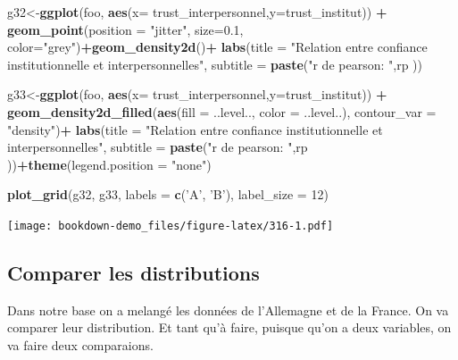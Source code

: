 \documentclass[
]{book}
\newenvironment{Shaded}{\begin{snugshade}}{\end{snugshade}}
\newcommand{\DataTypeTok}[1]{\textcolor[rgb]{0.13,0.29,0.53}{#1}}
\newcommand{\DecValTok}[1]{\textcolor[rgb]{0.00,0.00,0.81}{#1}}
\newcommand{\FloatTok}[1]{\textcolor[rgb]{0.00,0.00,0.81}{#1}}
\newcommand{\KeywordTok}[1]{\textcolor[rgb]{0.13,0.29,0.53}{\textbf{#1}}}
\newcommand{\NormalTok}[1]{#1}
\newcommand{\OperatorTok}[1]{\textcolor[rgb]{0.81,0.36,0.00}{\textbf{#1}}}
\newcommand{\StringTok}[1]{\textcolor[rgb]{0.31,0.60,0.02}{#1}}
\begin{document}
\begin{Shaded}
\begin{Highlighting}[]
\NormalTok{g32<-}\KeywordTok{ggplot}\NormalTok{(foo, }\KeywordTok{aes}\NormalTok{(}\DataTypeTok{x=}\NormalTok{ trust_interpersonnel,}\DataTypeTok{y=}\NormalTok{trust_institut)) }\OperatorTok{+}
\StringTok{  }\KeywordTok{geom_point}\NormalTok{(}\DataTypeTok{position =} \StringTok{"jitter"}\NormalTok{, }\DataTypeTok{size=}\FloatTok{0.1}\NormalTok{, }\DataTypeTok{color=}\StringTok{"grey"}\NormalTok{)}\OperatorTok{+}\KeywordTok{geom_density2d}\NormalTok{()}\OperatorTok{+}
\StringTok{  }\KeywordTok{labs}\NormalTok{(}\DataTypeTok{title =} \StringTok{"Relation entre confiance institutionnelle et interpersonnelles"}\NormalTok{, }\DataTypeTok{subtitle =} \KeywordTok{paste}\NormalTok{(}\StringTok{"r de pearson: "}\NormalTok{,rp ))}
  
\NormalTok{g33<-}\KeywordTok{ggplot}\NormalTok{(foo, }\KeywordTok{aes}\NormalTok{(}\DataTypeTok{x=}\NormalTok{ trust_interpersonnel,}\DataTypeTok{y=}\NormalTok{trust_institut)) }\OperatorTok{+}
\StringTok{  }\KeywordTok{geom_density2d_filled}\NormalTok{(}\KeywordTok{aes}\NormalTok{(}\DataTypeTok{fill =}\NormalTok{ ..level.., }\DataTypeTok{color =}\NormalTok{ ..level..),}
    \DataTypeTok{contour_var =} \StringTok{"density"}\NormalTok{)}\OperatorTok{+}
\StringTok{  }\KeywordTok{labs}\NormalTok{(}\DataTypeTok{title =} \StringTok{"Relation entre confiance institutionnelle et interpersonnelles"}\NormalTok{, }\DataTypeTok{subtitle =} \KeywordTok{paste}\NormalTok{(}\StringTok{"r de pearson: "}\NormalTok{,rp ))}\OperatorTok{+}\KeywordTok{theme}\NormalTok{(}\DataTypeTok{legend.position =} \StringTok{"none"}\NormalTok{)}
  

\KeywordTok{plot_grid}\NormalTok{(g32, g33, }\DataTypeTok{labels =} \KeywordTok{c}\NormalTok{(}\StringTok{'A'}\NormalTok{, }\StringTok{'B'}\NormalTok{), }\DataTypeTok{label_size =} \DecValTok{12}\NormalTok{)}
\end{Highlighting}
\end{Shaded}

\texttt{[image: bookdown-demo\_files/figure-latex/316-1.pdf]}

\hypertarget{comparer-les-distributions}{%
\subsection{Comparer les distributions}\label{comparer-les-distributions}}

Dans notre base on a melangé les données de l'Allemagne et de la France. On va comparer leur distribution. Et tant qu'à faire, puisque qu'on a deux variables, on va faire deux comparaions.
\end{document}
